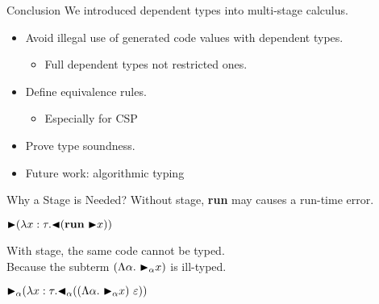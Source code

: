 \documentclass[dvipdfmx,aspectratio=169, 20pt]{beamer}
\begin{document}
\begin{frame}[fragile]{Conclusion}
    We introduced dependent types into multi-stage calculus.
    \begin{itemize}
        \item Avoid illegal use of generated code values with dependent types.
            \begin{itemize}
                \item Full dependent types not restricted ones.
            \end{itemize}
        \item Define equivalence rules.
            \begin{itemize}
                \item Especially for CSP
            \end{itemize}
        \item Prove type soundness.
        \item Future work: algorithmic typing
    \end{itemize}
\end{frame}

\begin{frame}[fragile]{Why a Stage is Needed?}
    Without stage, \textbf{run} may causes a run-time error.
    \begin{exampleblock}{}
        \begin{center}
    \( \TB (\lambda x:\tau. \TBL (\textbf{run}\ \TB x)) \)
        \end{center}
    \end{exampleblock}

    With stage, the same code cannot be typed.\\
    Because the subterm \( (\Lambda\alpha.\ \TB_\alpha x) \) is ill-typed.
    \begin{exampleblock}{}
        \begin{center}
    \( {\mathop{\blacktriangleright}}_\alpha (\lambda x:\tau. {\mathop{\blacktriangleleft}}_\alpha ((\Lambda\alpha.\ {\mathop{\blacktriangleright}}_\alpha x)\ \varepsilon)) \)
        \end{center}
    \end{exampleblock}
\end{frame}
\end{document}
